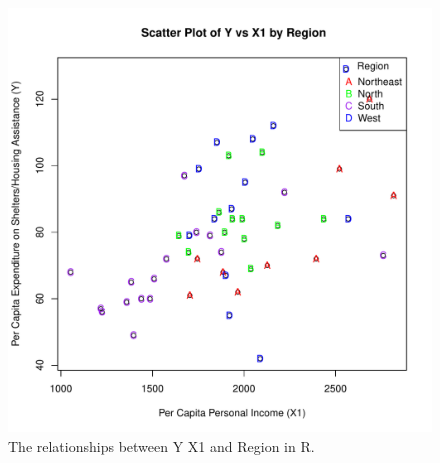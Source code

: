 \documentclass[12pt,letterpaper]{article}
\begin{document}
\begin{itemize}
	\begin{figure}[h!]\centering
	\caption{\footnotesize The relationships between Y X1 and Region in R.}
	\label{fig:plot_4}
	\includegraphics[width=.85\textwidth]{Problem2_Question3_Plot_Y_X1_Region.pdf}
	\end{figure}

\end{itemize}
\end{document}
